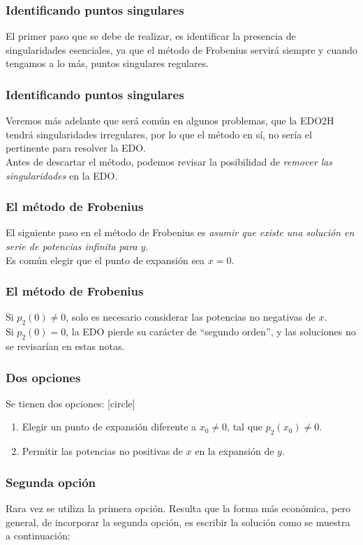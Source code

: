\documentclass[12pt]{beamer}
\begin{document}
\begin{frame}
\frametitle{Identificando puntos singulares}
El primer paso que se debe de realizar, es identificar la presencia de singularidades esenciales, ya que el método de Frobenius servirá siempre y cuando tengamos a lo más, puntos singulares regulares.
\end{frame}
\begin{frame}
\frametitle{Identificando puntos singulares}Veremos más adelante que será común en algunos problemas, que la EDO2H tendrá singularidades irregulares, por lo que el método en sí, no sería el pertinente para resolver la EDO.
\\
\bigskip
\pause
Antes de descartar el método, podemos revisar la posibilidad de \emph{remover las singularidades} en la EDO.
\end{frame}
\begin{frame}
\frametitle{El método de Frobenius}
El siguiente paso en el método de Frobenius es \emph{asumir que existe una solución en serie de potencias infinita para $y$}.
\\
\bigskip
Es común elegir que el punto de expansión sea $x = 0$.
\end{frame}
\begin{frame}
\frametitle{El método de Frobenius}
Si $p_{2} (0) \neq 0$, solo es necesario considerar las potencias no negativas de $x$.
\\
\bigskip
\pause
Si $p_{2} (0) = 0$, la EDO pierde su carácter de \enquote{segundo orden}, y las soluciones no se revisarían en estas notas.
\end{frame}
\begin{frame}
\frametitle{Dos opciones}
Se tienen dos opciones:
[circle]
\begin{enumerate}[<+->]
\item Elegir un punto de expansión diferente a $x_{0} \neq 0$, tal que $p_{2} (x_{0}) \neq 0$.
\item Permitir las potencias no positivas de $x$ en la expansión de $y$.
\end{enumerate}
\end{frame}
\begin{frame}
\frametitle{Segunda opción}
Rara vez se utiliza la primera opción. Resulta que la forma más económica, pero general, de incorporar la segunda opción, es escribir la solución como se muestra a continuación:
\end{frame}
\end{document}
